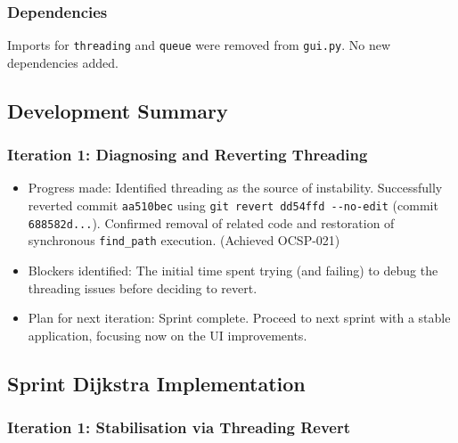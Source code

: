 \subsubsection{Dependencies}
Imports for \verb|threading| and \verb|queue| were removed from \verb|gui.py|. No new dependencies added.

\subsection{Development Summary}

\subsubsection{Iteration 1: Diagnosing and Reverting Threading}
\begin{itemize}
	\item Progress made: Identified threading as the source of instability. Successfully reverted commit \verb|aa510bec| using \verb|git revert dd54ffd --no-edit| (commit \verb|688582d...|). Confirmed removal of related code and restoration of synchronous \verb|find_path| execution. (Achieved OCSP-021)
	\item Blockers identified: The initial time spent trying (and failing) to debug the threading issues before deciding to revert.
	\item Plan for next iteration: Sprint complete. Proceed to next sprint with a stable application, focusing now on the UI improvements.
\end{itemize}

\clearpage
\subsection{Sprint Dijkstra Implementation}

\subsubsection{Iteration 1: Stabilisation via Threading Revert}


